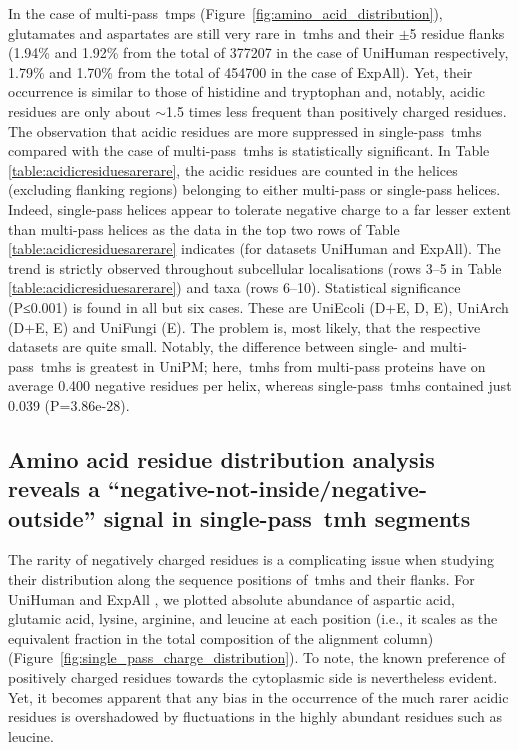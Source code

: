 In the case of multi-pass~\gls{tmp}s (Figure~\ref{fig:amino_acid_distribution}), glutamates and aspartates are still very rare in~\gls{tmh}s and their $\pm$5 residue flanks (1.94\% and 1.92\% from the total of 377207 in the case of UniHuman respectively, 1.79\% and 1.70\% from the total of 454700 in the case of ExpAll).
Yet, their occurrence is similar to those of histidine and tryptophan and, notably, acidic residues are only about $\sim$1.5 times less frequent than positively charged residues.
The observation that acidic residues are more suppressed in single-pass~\gls{tmh}s compared with the case of multi-pass~\gls{tmh}s is statistically significant.
In Table \ref{table:acidicresiduesarerare}, the acidic residues are counted in the helices (excluding flanking regions) belonging to either multi-pass or single-pass helices.
Indeed, single-pass helices appear to tolerate negative charge to a far lesser extent than multi-pass helices as the data in the top two rows of Table \ref{table:acidicresiduesarerare} indicates (for datasets UniHuman and ExpAll).
The trend is strictly observed throughout subcellular localisations (rows 3--5 in Table \ref{table:acidicresiduesarerare}) and taxa (rows 6--10).
Statistical significance (P≤0.001) is found in all but six cases.
These are UniEcoli (D+E, D, E), UniArch (D+E, E) and UniFungi (E).
The problem is, most likely, that the respective datasets are quite small.
Notably, the difference between single- and multi-pass~\gls{tmh}s is greatest in UniPM\@; here,~\gls{tmh}s from multi-pass proteins have on average 0.400 negative residues per helix, whereas single-pass~\gls{tmh}s contained just 0.039 (P=3.86e-28).

\subsection{Amino acid residue distribution analysis reveals a ``negative-not-inside/negative-outside'' signal in single-pass~\gls{tmh} segments}

The rarity of negatively charged residues is a complicating issue when studying their distribution along the sequence positions of~\gls{tmh}s and their flanks.
For UniHuman and ExpAll , we plotted absolute abundance of aspartic acid, glutamic acid, lysine, arginine, and leucine at each position (i.e., it scales as the equivalent fraction in the total composition of the alignment column) (Figure~\ref{fig:single_pass_charge_distribution}).
To note, the known preference of positively charged residues towards the cytoplasmic side is nevertheless evident.
Yet, it becomes apparent that any bias in the occurrence of the much rarer acidic residues is overshadowed by fluctuations in the highly abundant residues such as leucine.

